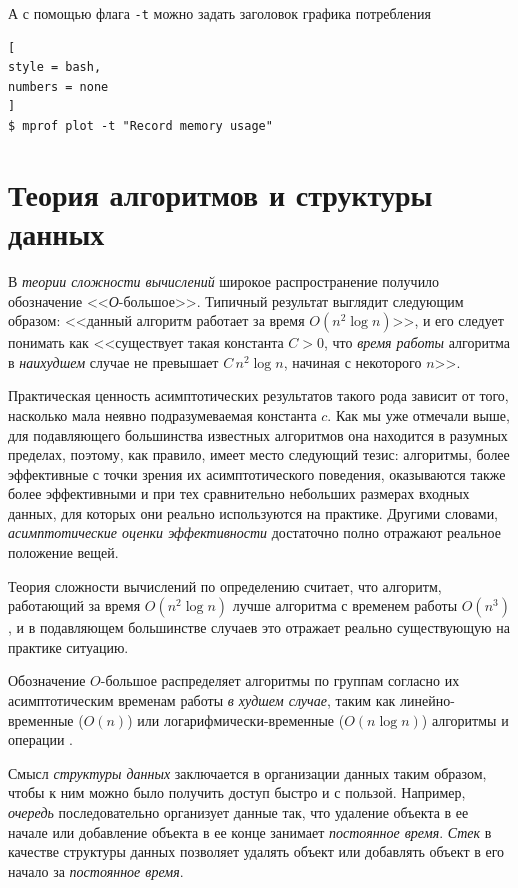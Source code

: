 \documentclass[%
	11pt,
	a4paper,
	utf8,
		]{article}
\begin{document}
А с помощью флага \verb|-t| можно задать заголовок графика потребления
\begin{lstlisting}[
style = bash,
numbers = none
]
$ mprof plot -t "Record memory usage"
\end{lstlisting}



\section{Теория алгоритмов и структуры данных}

В \emph{теории сложности вычислений} широкое распространение получило обозначение <<\emph{О}-большое>>. Типичный результат выглядит следующим образом: <<данный алгоритм работает за время $ O(n^2 \log n) $>>, и его следует понимать как <<существует такая константа $ C > 0 $, что \emph{время работы} алгоритма в \emph{наихудшем} случае не превышает $ C\,n^2 \log n $, начиная с некоторого $ n $>>.

Практическая ценность асимптотических результатов такого рода зависит от того, насколько мала неявно подразумеваемая константа $ c $. Как мы уже отмечали выше, для подавляющего большинства известных алгоритмов она находится в разумных пределах, поэтому, как правило, имеет место следующий тезис: алгоритмы, более эффективные с точки зрения их асимптотического поведения, оказываются также более эффективными и при тех сравнительно небольших размерах входных данных, для которых они реально используются на практике. Другими словами, \emph{асимптотические оценки эффективности} достаточно полно отражают реальное положение вещей.

Теория сложности вычислений по определению считает, что алгоритм, работающий за время $ O(n^2 \log n) $ лучше алгоритма с временем работы $ O(n^3) $, и в подавляющем большинстве случаев это отражает реально существующую на практике ситуацию.

Обозначение $ O $-большое распределяет алгоритмы по группам согласно их асимптотическим временам работы \emph{в худшем случае}, таким как линейно-временные ($ O(n) $) или логарифмически-временные ($ O(n \log n) $) алгоритмы и операции \cite[246]{roughgarden-graph:2019}.

Смысл \emph{структуры данных} заключается в организации данных таким образом, чтобы к ним можно было получить доступ быстро и с пользой. Например, \emph{очередь} последовательно организует данные так, что удаление объекта в ее начале или добавление объекта в ее конце занимает \emph{постоянное время}. \emph{Стек} в качестве структуры данных позволяет удалять объект или добавлять объект в его начало за \emph{постоянное время}.
\end{document}
